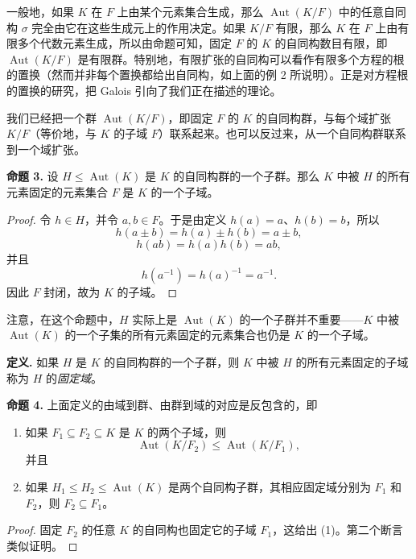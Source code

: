 一般地，如果 $K$ 在 $F$ 上由某个元素集合生成，那么 $\operatorname{Aut}(K/F)$ 中的任意自同构 $\sigma$ 完全由它在这些生成元上的作用决定。如果 $K/F$ 有限，那么 $K$ 在 $F$ 上由有限多个代数元素生成，所以由命题可知，固定 $F$ 的 $K$ 的自同构数目有限，即 $\operatorname{Aut}(K/F)$ 是有限群。特别地，有限扩张的自同构可以看作有限多个方程的根的置换（然而并非每个置换都给出自同构，如上面的例 2 所说明）。正是对方程根的置换的研究，把 Galois 引向了我们正在描述的理论。

我们已经把一个群 $\operatorname{Aut}(K/F)$，即固定 $F$ 的 $K$ 的自同构群，与每个域扩张 $K/F$（等价地，与 $K$ 的子域 $F$）联系起来。也可以反过来，从一个自同构群联系到一个域扩张。

\noindent\textbf{命题 3.} 设 $H\leq \operatorname{Aut}(K)$ 是 $K$ 的自同构群的一个子群。那么 $K$ 中被 $H$ 的所有元素固定的元素集合 $F$ 是 $K$ 的一个子域。

\begin{proof}
令 $h\in H$，并令 $a,b\in F$。于是由定义 $h(a)=a$、$h(b)=b$，所以
\[
h(a\pm b)=h(a)\pm h(b)=a\pm b,
\]
\[
h(ab)=h(a)h(b)=ab,
\]
并且
\[
h(a^{-1})=h(a)^{-1}=a^{-1}.
\]
因此 $F$ 封闭，故为 $K$ 的子域。
\end{proof}

注意，在这个命题中，$H$ 实际上是 $\operatorname{Aut}(K)$ 的一个子群并不重要——$K$ 中被 $\operatorname{Aut}(K)$ 的一个子集的所有元素固定的元素集合也仍是 $K$ 的一个子域。

\noindent\textbf{定义.} 如果 $H$ 是 $K$ 的自同构群的一个子群，则 $K$ 中被 $H$ 的所有元素固定的子域称为 $H$ 的\emph{固定域}。

\noindent\textbf{命题 4.} 上面定义的由域到群、由群到域的对应是反包含的，即
\begin{enumerate}[label=(\arabic*)]
\item 如果 $F_1\subseteq F_2\subseteq K$ 是 $K$ 的两个子域，则
\[
\operatorname{Aut}(K/F_2)\leq \operatorname{Aut}(K/F_1),
\]
并且
\item 如果 $H_1\leq H_2\leq \operatorname{Aut}(K)$ 是两个自同构子群，其相应固定域分别为 $F_1$ 和 $F_2$，则 $F_2\subseteq F_1$。
\end{enumerate}

\begin{proof}
固定 $F_2$ 的任意 $K$ 的自同构也固定它的子域 $F_1$，这给出 (1)。第二个断言类似证明。
\end{proof}

